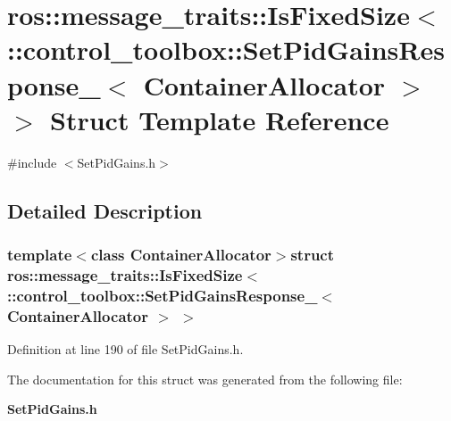 \section{ros\-:\-:message\-\_\-traits\-:\-:\-Is\-Fixed\-Size$<$ \-:\-:control\-\_\-toolbox\-:\-:\-Set\-Pid\-Gains\-Response\-\_\-$<$ \-Container\-Allocator $>$ $>$ \-Struct \-Template \-Reference}
\label{structros_1_1message__traits_1_1IsFixedSize_3_01_1_1control__toolbox_1_1SetPidGainsResponse___3_01ContainerAllocator_01_4_01_4}


{\ttfamily \#include $<$\-Set\-Pid\-Gains.\-h$>$}



\subsection{\-Detailed \-Description}
\subsubsection*{template$<$class Container\-Allocator$>$struct ros\-::message\-\_\-traits\-::\-Is\-Fixed\-Size$<$ \-::control\-\_\-toolbox\-::\-Set\-Pid\-Gains\-Response\-\_\-$<$ Container\-Allocator $>$ $>$}



\-Definition at line 190 of file \-Set\-Pid\-Gains.\-h.



\-The documentation for this struct was generated from the following file\-:\begin{DoxyCompactItemize}
\item 
{\bf \-Set\-Pid\-Gains.\-h}\end{DoxyCompactItemize}

